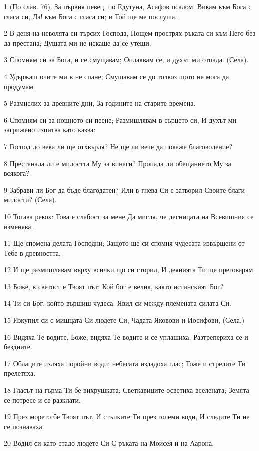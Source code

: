 \par 1 (По слав. 76). За първия певец, по Едутуна, Асафов псалом. Викам към Бога с гласа си, Да! към Бога с гласа си; и Той ще ме послуша.
\par 2 В деня на неволята си търсих Господа, Нощем прострях ръката си към Него без да престана; Душата ми не искаше да се утеши.
\par 3 Спомням си за Бога, и се смущавам; Оплаквам се, и духът ми отпада. (Села).
\par 4 Удържаш очите ми в не спане; Смущавам се до толкоз щото не мога да продумам.
\par 5 Размислих за древните дни, За годините на старите времена.
\par 6 Спомням си за нощното си пеене; Размишлявам в сърцето си, И духът ми загрижено изпитва като казва:
\par 7 Господ до века ли ще отхвърля? Не ще ли вече да покаже благоволение?
\par 8 Престанала ли е милостта Му за винаги? Пропада ли обещанието Му за всякога?
\par 9 Забрави ли Бог да бъде благодатен? Или в гнева Си е затворил Своите благи милости? (Села).
\par 10 Тогава рекох: Това е слабост за мене Да мисля, че десницата на Всевишния се изменява.
\par 11 Ще спомена делата Господни; Защото ще си спомня чудесата извършени от Тебе в древността,
\par 12 И ще размишлявам върху всички що си сторил, И деянията Ти ще преговарям.
\par 13 Боже, в светост е Твоят път; Кой бог е велик, както истинският Бог?
\par 14 Ти си Бог, който вършиш чудеса; Явил си между племената силата Си.
\par 15 Изкупил си с мишцата Си людете Си, Чадата Яковови и Иосифови, (Села.)
\par 16 Видяха Те водите, Боже, видяха Те водите и се уплашиха; Разтрепериха се и бездните.
\par 17 Облаците изляха поройни води; небесата издадоха глас; Тоже и стрелите Ти прелетяха.
\par 18 Гласът на гърма Ти бе вихрушката; Светкавиците осветиха вселената; Земята се потресе и се разклати.
\par 19 През морето бе Твоят път, И стъпките Ти през големи води, И следите Ти не се познаваха.
\par 20 Водил си като стадо людете Си С ръката на Моисея и на Аарона.

